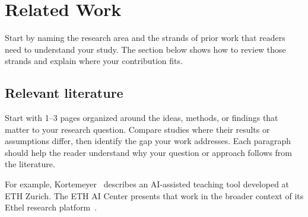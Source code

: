 \chapter{Related Work}
\label{chap:background}

Start by naming the research area and the strands of prior work that readers need to understand your study. The section below shows how to review those strands and explain where your contribution fits.

\section{Relevant literature}
Start with 1--3 pages organized around the ideas, methods, or findings that matter to your research question. Compare studies where their results or assumptions differ, then identify the gap your work addresses. Each paragraph should help the reader understand why your question or approach follows from the literature.

For example, Kortemeyer~\cite{kortemeyer2024} describes an AI-assisted teaching tool developed at ETH Zurich. The ETH AI Center presents that work in the broader context of its Ethel research platform~\cite{ethai-ethel}.

